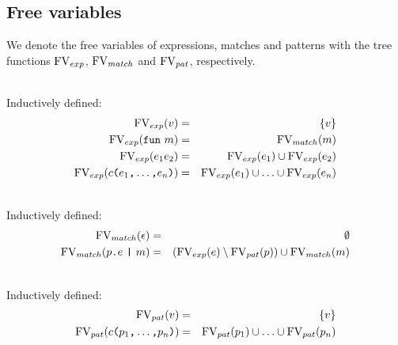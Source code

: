 

\subsection{Free variables}\label{sec:free-variables}

We denote the free variables of expressions, matches and patterns with the tree
functions $\mathrm{FV}_{exp}$, $\mathrm{FV}_{match}$ and $\mathrm{FV}_{pat}$, respectively.

\begin{definition} \ \\
  Inductively defined:
  \begin{eqnarray}
    \mathrm{FV}_{exp} (v) &=& \{v\} \\
    \mathrm{FV}_{exp} (\texttt{fun}\  m) &=& \mathrm{FV}_{match} (m) \\
    \mathrm{FV}_{exp} (e_1e_2) &=& \mathrm{FV}_{exp} (e_1) \cup \mathrm{FV}_{exp} (e_2) \\
    \mathrm{FV}_{exp} (c\texttt{(}e_1\texttt{,} \ldots \texttt{,} e_n \texttt{)}) &=& \mathrm{FV}_{exp}
    (e_1) \cup \ldots \cup \mathrm{FV}_{exp} (e_n)
  \end{eqnarray}
\end{definition}

\begin{definition}\ \\ 
  Inductively defined:
  \begin{eqnarray}
    \mathrm{FV}_{match} (\epsilon) &=& \emptyset \\
    \mathrm{FV}_{match} (p\texttt{.}e\ \texttt{|}\ m) &=& \left( \mathrm{FV}_{exp}(e) \setminus
      \mathrm{FV}_{pat}(p) \right) \cup \mathrm{FV}_{match} (m)
  \end{eqnarray}
\end{definition}

\begin{definition} \ \\
  Inductively defined:
  \begin{eqnarray}
    \mathrm{FV}_{pat} (v) &=& \{v\} \\
    \mathrm{FV}_{pat} (c\texttt{(}p_1\texttt{,} \ldots \texttt{,} p_n\texttt{)}) &=& \mathrm{FV}_{pat} (p_1)
    \cup \ldots \cup \mathrm{FV}_{pat} (p_n)
  \end{eqnarray}
\end{definition}


